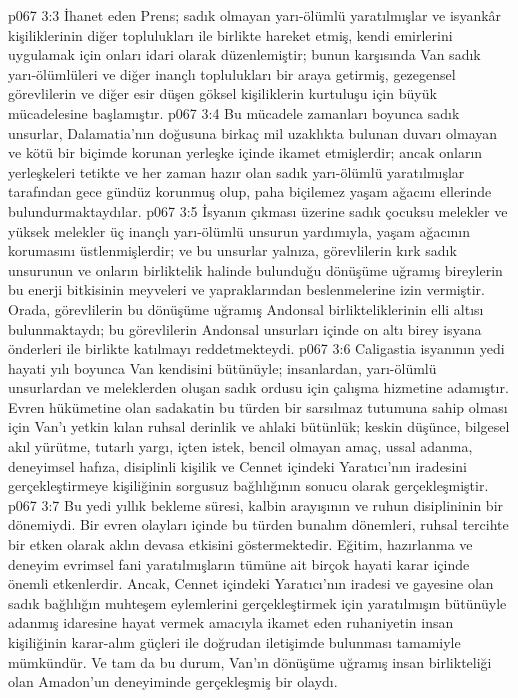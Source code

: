 \vs p067 3:3 İhanet eden Prens; sadık olmayan yarı\hyp{}ölümlü yaratılmışlar ve isyankâr kişiliklerinin diğer toplulukları ile birlikte hareket etmiş, kendi emirlerini uygulamak için onları idari olarak düzenlemiştir; bunun karşısında Van sadık yarı\hyp{}ölümlüleri ve diğer inançlı toplulukları bir araya getirmiş, gezegensel görevlilerin ve diğer esir düşen göksel kişiliklerin kurtuluşu için büyük mücadelesine başlamıştır.
\vs p067 3:4 Bu mücadele zamanları boyunca sadık unsurlar, Dalamatia’nın doğusuna birkaç mil uzaklıkta bulunan duvarı olmayan ve kötü bir biçimde korunan yerleşke içinde ikamet etmişlerdir; ancak onların yerleşkeleri tetikte ve her zaman hazır olan sadık yarı\hyp{}ölümlü yaratılmışlar tarafından gece gündüz korunmuş olup, paha biçilemez yaşam ağacını ellerinde bulundurmaktaydılar.
\vs p067 3:5 İsyanın çıkması üzerine sadık çocuksu melekler ve yüksek melekler üç inançlı yarı\hyp{}ölümlü unsurun yardımıyla, yaşam ağacının korumasını üstlenmişlerdir; ve bu unsurlar yalnıza, görevlilerin kırk sadık unsurunun ve onların birliktelik halinde bulunduğu dönüşüme uğramış bireylerin bu enerji bitkisinin meyveleri ve yapraklarından beslenmelerine izin vermiştir. Orada, görevlilerin bu dönüşüme uğramış Andonsal birlikteliklerinin elli altısı bulunmaktaydı; bu görevlilerin Andonsal unsurları içinde on altı birey isyana önderleri ile birlikte katılmayı reddetmekteydi.
\vs p067 3:6 Caligastia isyanının yedi hayati yılı boyunca Van kendisini bütünüyle; insanlardan, yarı\hyp{}ölümlü unsurlardan ve meleklerden oluşan sadık ordusu için çalışma hizmetine adamıştır. Evren hükümetine olan sadakatin bu türden bir sarsılmaz tutumuna sahip olması için Van’ı yetkin kılan ruhsal derinlik ve ahlaki bütünlük; keskin düşünce, bilgesel akıl yürütme, tutarlı yargı, içten istek, bencil olmayan amaç, ussal adanma, deneyimsel hafıza, disiplinli kişilik ve Cennet içindeki Yaratıcı’nın iradesini gerçekleştirmeye kişiliğinin sorgusuz bağlılığının sonucu olarak gerçekleşmiştir.
\vs p067 3:7 Bu yedi yıllık bekleme süresi, kalbin arayışının ve ruhun disiplininin bir dönemiydi. Bir evren olayları içinde bu türden bunalım dönemleri, ruhsal tercihte bir etken olarak aklın devasa etkisini göstermektedir. Eğitim, hazırlanma ve deneyim evrimsel fani yaratılmışların tümüne ait birçok hayati karar içinde önemli etkenlerdir. Ancak, Cennet içindeki Yaratıcı’nın iradesi ve gayesine olan sadık bağlılığın muhteşem eylemlerini gerçekleştirmek için yaratılmışın bütünüyle adanmış idaresine hayat vermek amacıyla ikamet eden ruhaniyetin insan kişiliğinin karar\hyp{}alım güçleri ile doğrudan iletişimde bulunması tamamiyle mümkündür. Ve tam da bu durum, Van’ın dönüşüme uğramış insan birlikteliği olan Amadon’un deneyiminde gerçekleşmiş bir olaydı.
